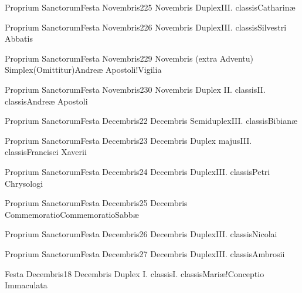 \documentclass[invitatoriale-romanum.tex]{subfiles}
\begin{document}
	{Proprium Sanctorum}{Festa Novembris}{2}{25 Novembris}
	{Duplex}{III. classis}{Catharinæ}
	{}
	{}

	{Proprium Sanctorum}{Festa Novembris}{2}{26 Novembris}
	{Duplex}{III. classis}{Silvestri Abbatis}
	{}
	{}

	{Proprium Sanctorum}{Festa Novembris}{2}{29 Novembris (extra Adventu)}
	{Simplex}{(Omittitur)}{Andreæ Apostoli!Vigilia}
	{}
	{}
\invitferia

	{Proprium Sanctorum}{Festa Novembris}{2}{30 Novembris}
	{Duplex II. classis}{II. classis}{Andreæ Apostoli}
	{}
	{}

\pagebreak


	{Proprium Sanctorum}{Festa Decembris}{2}{2 Decembris}
	{Semiduplex}{III. classis}{Bibianæ}
	{}
	{}

	{Proprium Sanctorum}{Festa Decembris}{2}{3 Decembris}
	{Duplex majus}{III. classis}{Francisci Xaverii}
	{}
	{}

	{Proprium Sanctorum}{Festa Decembris}{2}{4 Decembris}
	{Duplex}{III. classis}{Petri Chrysologi}
	{}
	{}

	{Proprium Sanctorum}{Festa Decembris}{2}{5 Decembris}
	{Commemoratio}{Commemoratio}{Sabbæ}
	{}
	{}
\invitferia

	{Proprium Sanctorum}{Festa Decembris}{2}{6 Decembris}
	{Duplex}{III. classis}{Nicolai}
	{}
	{}

	{Proprium Sanctorum}{Festa Decembris}{2}{7 Decembris}
	{Duplex}{III. classis}{Ambrosii}
	{}
	{}

	{Festa Decembris}{1}{8 Decembris}
	{Duplex I. classis}{I. classis}{Mariæ!Conceptio Immaculata}
	{}
	{}
\end{document}
